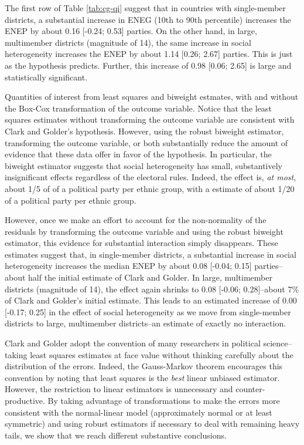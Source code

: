 \documentclass[12pt]{article}
\begin{document}
The first row of Table \ref{tab:cg-qi} suggest that in countries with single-member districts, a substantial increase in ENEG (10th to 90th percentile) increases the ENEP by about 0.16 [-0.24; 0.53] parties. On the other hand, in large, multimember districts (magnitude of 14), the same increase in social heterogeneity increases the ENEP by about 1.14 [0.26; 2.67] parties. This is just as the hypothesis predicts. Further, this increase of 0.98 [0.06; 2.65] is large and statistically significant.

\begin{table}[H]
{\scriptsize

}
\caption{Quantities of interest from least squares and biweight estmates, with and without the Box-Cox transformation of the outcome variable. Notice that the least squares estimates without transforming the outcome variable are consistent with Clark and Golder's hypothesis. However, using the robust biweight estimator,  transforming the outcome variable, or both substantially reduce the amount of evidence that these data offer in favor of the hypothesis. In particular, the biweight estimator suggests that social heterogeneity has small, substantively insignificant effects regardless of the electoral rules. Indeed, the effect is, \textit{at most}, about 1/5 of of a political party per ethnic group, with a estimate of about 1/20 of a political party per ethnic group. }\label{tab:cg-qi}
\end{table}

However, once we make an effort to account for the non-normality of the residuals by transforming the outcome variable and using the robust biweight estimator, this evidence for substantial interaction simply disappears. These estimates suggest that, in single-member districts, a substantial increase in social heterogeneity increases the median ENEP by about 0.08 [-0.04; 0.15] parties--about half the initial estimate of Clark and Golder. In large, multimember districts (magnitude of 14), the effect again shrinks to 0.08 [-0.06; 0.28]--about 7\% of Clark and Golder's initial estimate. This leads to an estimated increase of 0.00 [-0.17; 0.25] in the effect of social heterogeneity as we move from single-member districts to large, multimember districts--an estimate of exactly no interaction.

Clark and Golder adopt the convention of many researchers in political science--taking least squares estimates at face value without thinking carefully about the distribution of the errors. Indeed, the Gauss-Markov theorem encourages this convention by noting that least squares is the \textit{best} linear unbiased estimator. However, the restriction to linear estimators is unnecessary and counter-productive. By taking advantage of transformations to make the errors more consistent with the normal-linear model (approximately normal or at least symmetric) and using robust estimators if necessary to deal with remaining heavy tails, we show that we reach different substantive conclusions. 
\end{document}

